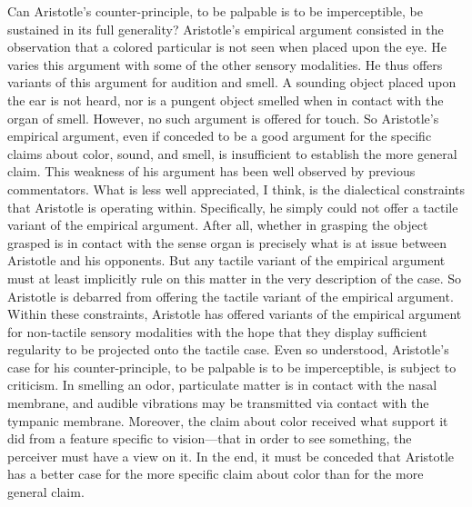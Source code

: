 Can Aristotle's counter-principle, to be palpable is to be imperceptible, be sustained in its full generality? Aristotle's empirical argument consisted in the observation that a colored particular is not seen when placed upon the eye. He varies this argument with some of the other sensory modalities. He thus offers variants of this argument for audition and smell. A sounding object placed upon the ear is not heard, nor is a pungent object smelled when in contact with the organ of smell. However, no such argument is offered for touch. So Aristotle's empirical argument, even if conceded to be a good argument for the specific claims about color, sound, and smell, is insufficient to establish the more general claim. This weakness of his argument has been well observed by previous commentators. What is less well appreciated, I think, is the dialectical constraints that Aristotle is operating within. Specifically, he simply could not offer a tactile variant of the empirical argument. After all, whether in grasping the object grasped is in contact with the sense organ is precisely what is at issue between Aristotle and his opponents. But any tactile variant of the empirical  argument must at least implicitly rule on this matter in the very description of the case. So Aristotle is debarred from offering the tactile variant of the empirical argument. Within these constraints, Aristotle has offered variants of the empirical argument for non-tactile sensory modalities with the hope that they display sufficient regularity to be projected onto the tactile case. Even so understood, Aristotle's case for his counter-principle, to be palpable is to be imperceptible, is subject to criticism. In smelling an odor, particulate matter is in contact with the nasal membrane, and audible vibrations may be transmitted via contact with the tympanic membrane. Moreover, the claim about color received what support it did from a feature specific to vision---that in order to see something, the perceiver must have a view on it. In the end, it must be conceded that Aristotle has a better case for the more specific claim about color than for the more general claim.

